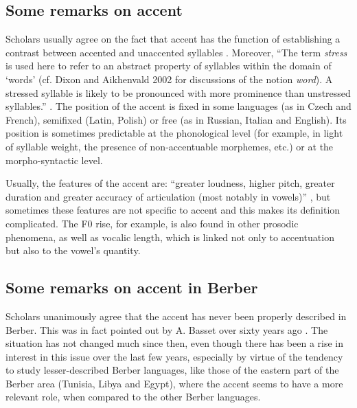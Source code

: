 \documentclass[output=paper]{langsci/langscibook}
\begin{document}
\subsection{Some remarks on accent}\label{5sec:11}

Scholars usually agree on the fact that accent has the function of establishing a contrast between accented and unaccented syllables \citep[][50]{garde:68}. Moreover, ``The term {\emph{stress}} is used here to refer to an abstract property of syllables within the domain of `words' (cf. Dixon and Aikhenvald 2002 for discussions of the notion {\emph{word}}). A stressed syllable is likely to be pronounced with more prominence than unstressed syllables.'' \citep[][Section 1]{goedemans:vanderhulst:13}. The position of the accent is fixed in some languages (as in Czech and French), semifixed (Latin, Polish) or free (as in Russian, Italian and English). Its position is sometimes predictable at the phonological level (for example, in light of syllable weight, the presence of non-accentuable morphemes, etc.) or at the morpho-syntactic level.

Usually, the features of the accent are: ``greater loudness, higher pitch, greater duration and greater accuracy of articulation (most notably in vowels)'' \citep[][Section 1]{goedemans:vanderhulst:13}, but sometimes these features are not specific to accent and this makes its definition complicated. The F0 rise, for example, is also found in other prosodic phenomena, as well as vocalic length, which is linked not only to accentuation but also to the vowel's quantity.


\subsection{Some remarks on accent in Berber}\label{5sec:12}

Scholars unanimously agree that the accent has never been properly described in Berber. This was in fact pointed out by A. Basset over sixty years ago \citep[][10]{basset:52}. The situation has not changed much since then, even though there has been a rise in interest in this issue over the last few years, especially by virtue of the tendency to study lesser-described Berber languages, like those of the eastern part of the Berber area (Tunisia, Libya and Egypt), where the accent seems to have a more relevant role, when compared to the other Berber languages.
\end{document}
